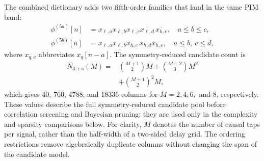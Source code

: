\documentclass[conference]{IEEEtran}
\begin{document}
The combined dictionary adds two fifth-order families that land in the same PIM band:
\begin{align}
 \phi^{(5a)}[n]&=x_{\ell,a}x_{\ell,b}x_{\ell,c}
                 \overline{x_{\ell,d}}\,\overline{x_{h,e}},
                 \quad a\leq b\leq c, \label{eq:im5a}\\
 \phi^{(5b)}[n]&=x_{\ell,a}x_{\ell,b}\overline{x_{h,c}}
                 \,\overline{x_{h,d}}x_{h,e},
                 \quad a\leq b,\ c\leq d, \label{eq:im5b}
\end{align}
where $x_{q,a}$ abbreviates $x_q[n-a]$. The symmetry-reduced candidate count is
\begin{equation}
\begin{split}
 N_{3+5}(M)={}&\binom{M+1}{2}M
 +\binom{M+2}{3}M^2\\
 &+\binom{M+1}{2}^{\!2}M,
\end{split}
\label{eq:n35}
\end{equation}
which gives 40, 760, 4788, and 18336 columns for $M=2,4,6,$ and $8$, respectively. These values describe the full symmetry-reduced candidate pool before correlation screening and Bayesian pruning; they are used only in the complexity and sparsity comparisons below. For clarity, $M$ denotes the number of causal taps per signal, rather than the half-width of a two-sided delay grid. The ordering restrictions remove algebraically duplicate columns without changing the span of the candidate model.
\end{document}
